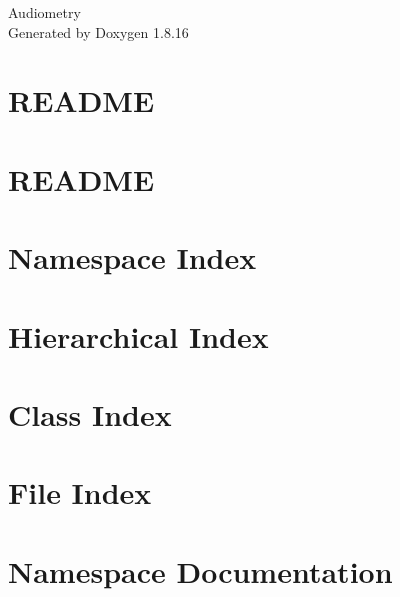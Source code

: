 \let\mypdfximage\pdfximage\def\pdfximage{\immediate\mypdfximage}\documentclass[twoside]{book}
\newcommand{\+}{\discretionary{\mbox{\scriptsize$\hookleftarrow$}}{}{}}
\newcommand{\clearemptydoublepage}{%
  \newpage{\pagestyle{empty}\cleardoublepage}%
}
\begin{document}
\hypersetup{pageanchor=false,
             bookmarksnumbered=true,
             pdfencoding=unicode
            }
\begin{titlepage}
\vspace*{7cm}
\begin{center}%
{\Large Audiometry }\\
\vspace*{1cm}
{\large Generated by Doxygen 1.8.16}\\
\end{center}
\end{titlepage}
\clearemptydoublepage
{}
\tableofcontents
\clearemptydoublepage
{}
\hypersetup{pageanchor=true}

\chapter{R\+E\+A\+D\+ME}
\label{a01361}

\chapter{R\+E\+A\+D\+ME}
\label{a01362}

\chapter{Namespace Index}

\chapter{Hierarchical Index}

\chapter{Class Index}

\chapter{File Index}

\chapter{Namespace Documentation}



























\end{document}
